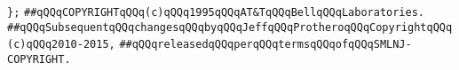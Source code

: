\newline
\verb|};|\newline
\newline
\newline
\newline
\verb|##qQQqCOPYRIGHTqQQq(c)qQQq1995qQQqAT&TqQQqBellqQQqLaboratories.|\newline
\verb|##qQQqSubsequentqQQqchangesqQQqbyqQQqJeffqQQqProtheroqQQqCopyrightqQQq(c)qQQq2010-2015,|\newline
\verb|##qQQqreleasedqQQqperqQQqtermsqQQqofqQQqSMLNJ-COPYRIGHT.|\newline

